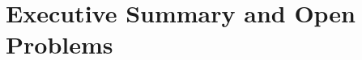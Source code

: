 \documentclass[11pt,a4paper]{report}
\begin{document}
\chapter{Executive Summary and Open Problems}
\label{ch:executive-summary}


\end{document}
